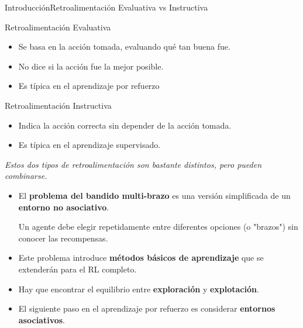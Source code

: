 \documentclass[10pt, envcountsect, handout, aspectratio=1610, hyperref={hypertexnames=true}]{beamer}
\begin{document}
\begin{frame}{Introducción}{Retroalimentación Evaluativa vs Instructiva}
    \begin{block}{Retroalimentación Evaluativa}
        \begin{itemize}
            \item Se basa en la acción tomada, evaluando qué tan buena fue.
            \item No dice si la acción fue la mejor posible.
            \item Es típica en el aprendizaje por refuerzo
        \end{itemize}
    \end{block}

    \begin{block}{Retroalimentación Instructiva}
        \begin{itemize}
            \item Indica la acción correcta sin depender de la acción tomada.
            \item Es típica en el aprendizaje supervisado.
        \end{itemize}
    \end{block}

    \centering
    \textit{Estos dos tipos de retroalimentación son bastante distintos, pero pueden combinarse.}



    \begin{itemize}
        \item El \textbf{problema del bandido multi-brazo} es una versión simplificada de un \textbf{entorno no asociativo}.
        
        Un agente debe elegir repetidamente entre diferentes opciones (o "brazos") sin conocer las recompensas.
        
        \item Este problema introduce \textbf{métodos básicos de aprendizaje} que se extenderán para el RL completo.
        
        \item Hay que encontrar el equilibrio entre \textbf{exploración} y \textbf{explotación}.    
        \item El siguiente paso en el aprendizaje por refuerzo es considerar \textbf{entornos asociativos}.
    \end{itemize}




\end{frame}
\end{document}
